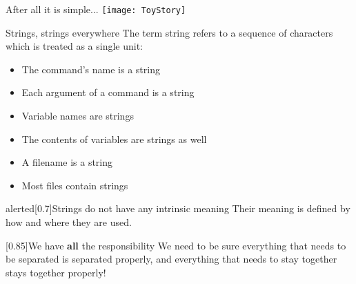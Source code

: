 
\begin{frame}{After all it is simple...}
    \centering
    \texttt{[image: ToyStory]}
\end{frame}
\begin{frame}{Strings, strings everywhere}
    \vspace{-3mm}
    The term string refers to a sequence of characters which is treated as a single unit:
    \begin{itemize}
        \item The command's name is a string
        \item Each argument of a command is a string
        \item Variable names are strings
        \item The contents of variables are strings as well
        \item A filename is a string
        \item Most files contain strings
    \end{itemize}
    \begin{varblock}{alerted}[0.7\textwidth]{Strings do not have any intrinsic meaning}
        Their meaning is defined by how and where they are used. 
    \end{varblock}
    \begin{varblock}{}[0.85\textwidth]{We have \textbf{all} the responsibility}
        We need to be sure everything that needs to be separated is separated properly, and everything that needs to stay together stays together properly!
    \end{varblock}
\end{frame}
